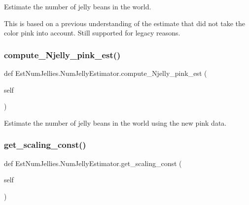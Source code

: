 Estimate the number of jelly beans in the world. 

This is based on a previous understanding of the estimate that did not take the color pink into account. Still supported for legacy reasons. \mbox{\label{class_est_num_jellies_1_1_num_jelly_estimator_a5a4f72a37cd411a42b24c9621c436a01}} 
\subsubsection{\texorpdfstring{compute\+\_\+\+Njelly\+\_\+pink\+\_\+est()}{compute\_Njelly\_pink\_est()}}
{\footnotesize\ttfamily def Est\+Num\+Jellies.\+Num\+Jelly\+Estimator.\+compute\+\_\+\+Njelly\+\_\+pink\+\_\+est (\begin{DoxyParamCaption}\item[{}]{self }\end{DoxyParamCaption})}



Estimate the number of jelly beans in the world using the new pink data. 

\mbox{\label{class_est_num_jellies_1_1_num_jelly_estimator_a8cc61de7181d21d6c1da52ddc1e7d133}} 
\subsubsection{\texorpdfstring{get\+\_\+scaling\+\_\+const()}{get\_scaling\_const()}}
{\footnotesize\ttfamily def Est\+Num\+Jellies.\+Num\+Jelly\+Estimator.\+get\+\_\+scaling\+\_\+const (\begin{DoxyParamCaption}\item[{}]{self }\end{DoxyParamCaption})}



